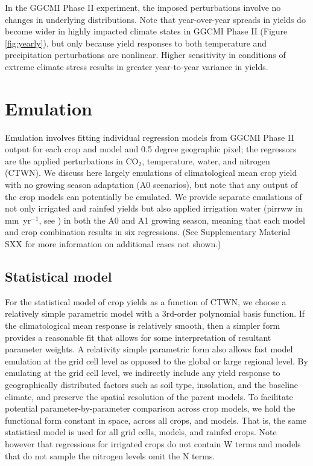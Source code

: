 \documentclass[gmd, manuscript]{copernicus} %
\begin{document}
In the GGCMI Phase II experiment, the imposed perturbations involve no changes in underlying distributions.%
Note that year-over-year spreads in yields do become wider in highly impacted climate states in GGCMI Phase II (Figure \ref{fig:yearly}), but only because yield responses to both temperature and precipitation perturbations are nonlinear. 
Higher sensitivity in conditions of extreme climate stress results in greater year-to-year variance in yields.

\section{Emulation}
\label{S:3}
Emulation involves fitting individual regression models from GGCMI Phase II output for each crop and model and 0.5 degree geographic pixel; the regressors are the applied perturbations in CO$_2$, temperature, water, and nitrogen (CTWN). 
We discuss here largely emulations of climatological mean crop yield with no growing season adaptation (A0 scenarios), but note that any output of the crop models can potentially be emulated. 
We provide separate emulations of not only irrigated and rainfed yields but also applied irrigation water (pirrww in mm\ yr$^{-1}$, see \citep{franke2019ctwnexperiment}) in both the A0 and A1 growing season, meaning that each model and crop combination results in six regressions. (See Supplementary Material SXX for more information on additional cases not shown.)

\subsection{Statistical model}
For the statistical model of crop yields as a function of CTWN, we choose a relatively simple parametric model with a 3rd-order polynomial basis function. 
If the climatological mean response is relatively smooth, then a simpler form provides a reasonable fit that allows for some interpretation of resultant parameter weights. 
A relativity simple parametric form also allows fast model emulation at the grid cell level as opposed to the global or large regional level. 
By emulating at the grid cell level, we indirectly include any yield response to geographically distributed factors such as soil type, insolation, and the baseline climate, and preserve the spatial resolution of the parent models.
To facilitate potential parameter-by-parameter comparison across crop models, we hold the functional form constant in space, across all crops, and models. 
That is, the same statistical model is used for all grid cells, models, and rainfed crops. 
Note however that regressions for irrigated crops do not contain W terms and models that do not sample the nitrogen levels omit the N terms.
\end{document}

